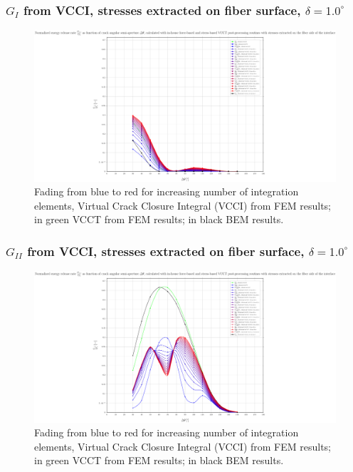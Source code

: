\begin{frame}
\frametitle{\small $G_{I}$ from VCCI, stresses extracted on fiber surface, $\delta=1.0^{\circ}$}
\vspace{-0.5cm}
\centering
\captionsetup[figure]{font=scriptsize,labelfont=scriptsize}
\begin{figure}[!h]
\centering
\includegraphics[height=0.7\textheight]{2017-07-25_AbqRunSummary_SmallStrain_D10/pdf/2017-07-25_AbqRunSummary_SmallStrain_D10_F-SoF-VCCT_GI.pdf}
  \caption{\scriptsize Fading from blue to red for increasing number of integration elements, Virtual Crack Closure Integral (VCCI) from FEM results; in green VCCT from FEM results; in black BEM results.}
  \label{fig:res1}
\end{figure}
\end{frame}
\begin{frame}
\frametitle{\small $G_{II}$ from VCCI, stresses extracted on fiber surface, $\delta=1.0^{\circ}$}
\vspace{-0.5cm}
\centering
\captionsetup[figure]{font=scriptsize,labelfont=scriptsize}
\begin{figure}[!h]
\centering
\includegraphics[height=0.7\textheight]{2017-07-25_AbqRunSummary_SmallStrain_D10/pdf/2017-07-25_AbqRunSummary_SmallStrain_D10_F-SoF-VCCT_GII.pdf}
  \caption{\scriptsize Fading from blue to red for increasing number of integration elements, Virtual Crack Closure Integral (VCCI) from FEM results; in green VCCT from FEM results; in black BEM results.}
  \label{fig:res1}
\end{figure}
\end{frame}
